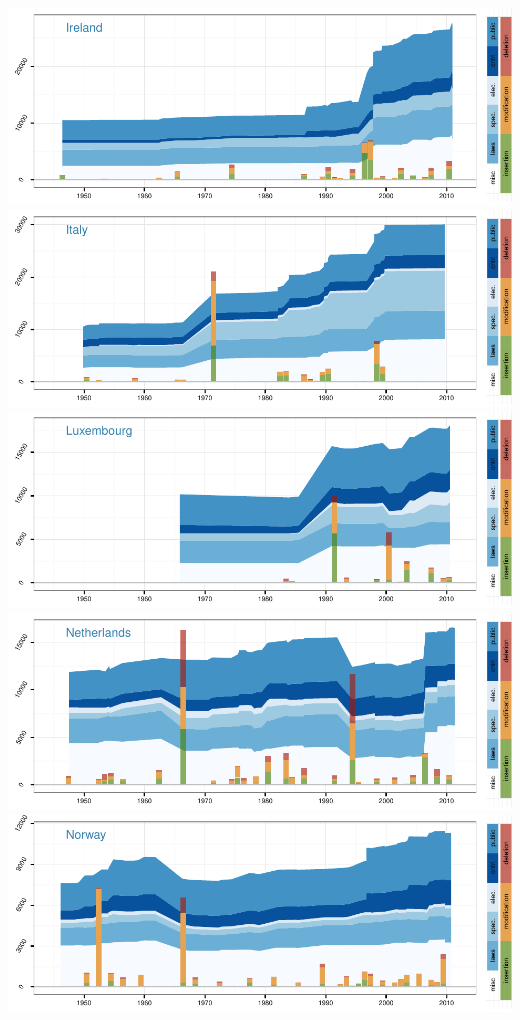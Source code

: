 \documentclass[a4paper]{article}
\begin{document}
\includegraphics{in_progress_files/figure-latex/unnamed-chunk-5-10.pdf}
\includegraphics{in_progress_files/figure-latex/unnamed-chunk-5-11.pdf}
\includegraphics{in_progress_files/figure-latex/unnamed-chunk-5-12.pdf}
\includegraphics{in_progress_files/figure-latex/unnamed-chunk-5-13.pdf}
\includegraphics{in_progress_files/figure-latex/unnamed-chunk-5-14.pdf}
\end{document}
